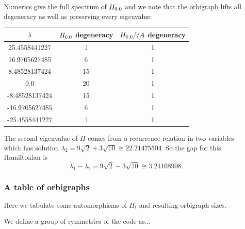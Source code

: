 \documentclass[12pt]{article}
\begin{document}

Numerics give the full spectrum of $H_{0,0}$ and we note that the orbigraph lifts
all degeneracy as well as preserving every eigenvalue:
\begin{center}
\begin{tabular}{ c|c|c } 
$\lambda$ & $H_{0,0}$ degeneracy & $H_{0,0}//A$ degeneracy \\
\hline
    25.4558441227 & 1 & 1 \\
    16.9705627485 & 6 & 1 \\
    8.48528137424 & 15 & 1 \\
    0.0 & 20 & 1 \\
    -8.48528137424 & 15 & 1 \\
    -16.9705627485 & 6 & 1 \\
    -25.4558441227 & 1 & 1 \\
\end{tabular}
\end{center}

The second eigenvalue of $H$ comes from a recurrence
relation in two variables which has solution
$\lambda_2 = 9\sqrt{2} + 3\sqrt{10} \cong 22.21475504.$
So the gap for this Hamiltonian  is 
$$\lambda_1 - \lambda_2 = 9\sqrt{2} - 3\sqrt{10} \cong 3.24108908.$$


%
\subsubsection{A table of orbigraphs}

Here we tabulate some automorphisms of $H_t$
and resulting orbigraph sizes.

We define a group of symmetries of the code as...
\end{document}
